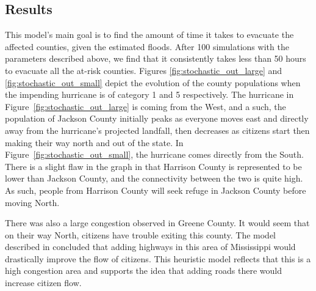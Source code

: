 \documentclass[titlepage]{article}
\begin{document}
  \subsection{Results}
    \par This model's main goal is to find the amount of time it takes to evacuate the affected counties, given the estimated floods. After 100 simulations with the parameters described above, we find that it consistently takes less than 50 hours to evacuate all the at-risk counties. Figures \ref{fig:stochastic_out_large} and \ref{fig:stochastic_out_small} depict the evolution of the county populations when the impending hurricane is of category 1 and 5 respectively. The hurricane in Figure~\ref{fig:stochastic_out_large} is coming from the West, and a such, the population of Jackson County initially peaks as everyone moves east and directly away from the hurricane's projected landfall, then decreases as citizens start then making their way north and out of the state. In Figure~\ref{fig:stochastic_out_small}, the hurricane comes directly from the South. There is a slight flaw in the graph in that Harrison County is represented to be lower than Jackson County, and the connectivity between the two is quite high. As such, people from Harrison County will seek refuge in Jackson County before moving North.
    \par There was also a large congestion observed in Greene County. It would seem that on their way North, citizens have trouble exiting this county. The model described in  concluded that adding highways in this area of Mississippi would drastically improve the flow of citizens. This heuristic model reflects that this is a high congestion area and supports the idea that adding roads there would increase citizen flow.
\end{document}
